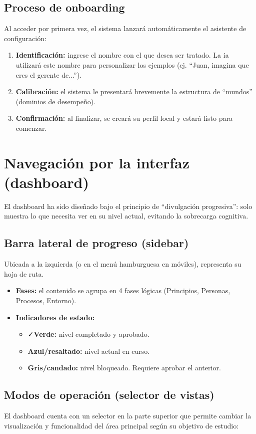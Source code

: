 \subsection{Proceso de onboarding}
Al acceder por primera vez, el sistema lanzará automáticamente el asistente de configuración:
\begin{enumerate}
\item \textbf{Identificación:} ingrese el nombre con el que desea ser tratado. La \gls{ia} utilizará este nombre para personalizar los ejemplos (ej. \enquote{Juan, imagina que eres el gerente de...}).
\item \textbf{Calibración:} el sistema le presentará brevemente la estructura de \enquote{mundos} (dominios de desempeño).
\item \textbf{Confirmación:} al finalizar, se creará su perfil local y estará listo para comenzar.
\end{enumerate}
\section{Navegación por la interfaz (dashboard)}

El dashboard ha sido diseñado bajo el principio de \enquote{divulgación progresiva}: solo muestra lo que necesita ver en su nivel actual, evitando la sobrecarga cognitiva.

\subsection{Barra lateral de progreso (sidebar)}
Ubicada a la izquierda (o en el menú hamburguesa en móviles), representa su hoja de ruta.
\begin{itemize}
\item \textbf{Fases:} el contenido se agrupa en 4 fases lógicas (Principios, Personas, Procesos, Entorno).
\item \textbf{Indicadores de estado:}
\begin{itemize}
\item \faCheck \textbf{Verde:} nivel completado y aprobado.
\item \faCircle \textbf{Azul/resaltado:} nivel actual en curso.
\item \faLock \textbf{Gris/candado:} nivel bloqueado. Requiere aprobar el anterior.
\end{itemize}
\end{itemize}
\subsection{Modos de operación (selector de vistas)}
El dashboard cuenta con un selector en la parte superior que permite cambiar la visualización y funcionalidad del área principal según su objetivo de estudio:

